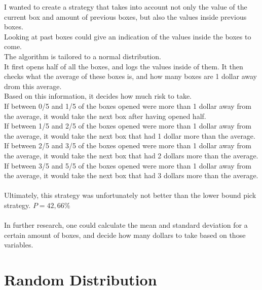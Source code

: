\documentclass{report}
\begin{document}
I wanted to create a strategy that takes into account not only the value of the current box and amount of previous boxes, but also the values inside previous boxes.\\
Looking at past boxes could give an indication of the values inside the boxes to come.\\
 The algorithm is tailored to a normal distribution.\\
  It first opens half of all the boxes, and logs the values inside of them. It then checks what the average of these boxes is, and how many boxes are 1 dollar away drom this average.\\
 Based on this information, it decides how much risk to take.\\
  If between 0/5 and 1/5 of the boxes opened were more than 1 dollar away from the average, it would take the next box after having opened half.\\
  If between 1/5 and 2/5 of the boxes opened were more than 1 dollar away from the average, it would take the next box that had 1 dollar more than the average.\\
 If between 2/5 and 3/5 of the boxes opened were more than 1 dollar away from the average, it would take the next box that had 2 dollars more than the average.\\
  If between 3/5 and 5/5 of the boxes opened were more than 1 dollar away from the average, it would take the next box that had 3 dollars more than the average.\\ \\
  
  Ultimately, this strategy was unfortunately not better than the lower bound pick strategy.
  \color{red}$P = 42,66 \%$ \color{black}
  \\ \\
  In further research, one could calculate the mean and standard deviation for a certain amount of boxes, and decide how many dollars to take based on those variables.
  
  \pagebreak
  
\section{Random Distribution}
\end{document}
